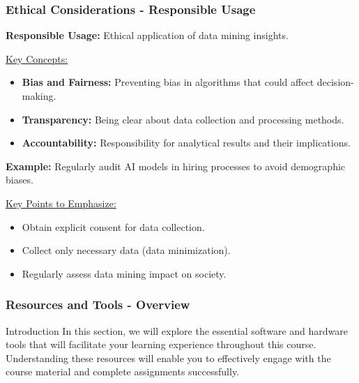 \documentclass[aspectratio=169]{beamer}
\begin{document}
\begin{frame}[fragile]
    \frametitle{Ethical Considerations - Responsible Usage}
    \textbf{Responsible Usage:} Ethical application of data mining insights.
    
    \underline{Key Concepts:}
    \begin{itemize}
        \item \textbf{Bias and Fairness:} Preventing bias in algorithms that could affect decision-making.
        \item \textbf{Transparency:} Being clear about data collection and processing methods.
        \item \textbf{Accountability:} Responsibility for analytical results and their implications.
    \end{itemize}

    \textbf{Example:} Regularly audit AI models in hiring processes to avoid demographic biases.

    \underline{Key Points to Emphasize:}
    \begin{itemize}
        \item Obtain explicit consent for data collection.
        \item Collect only necessary data (data minimization).
        \item Regularly assess data mining impact on society.
    \end{itemize}
\end{frame}

\begin{frame}[fragile]
    \frametitle{Resources and Tools - Overview}
    \begin{block}{Introduction}
        In this section, we will explore the essential software and hardware tools that will facilitate your learning experience throughout this course. Understanding these resources will enable you to effectively engage with the course material and complete assignments successfully.
    \end{block}
\end{frame}
\end{document}
